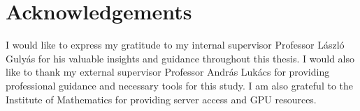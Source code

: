 \chapter*{Acknowledgements}

I would like to express my gratitude to my internal supervisor Professor László Gulyás for his valuable insights and guidance throughout this thesis. I would also like to thank my external supervisor Professor András Lukács for providing professional guidance and necessary tools for this study. I am also grateful to the Institute of Mathematics for providing server access and GPU resources.
